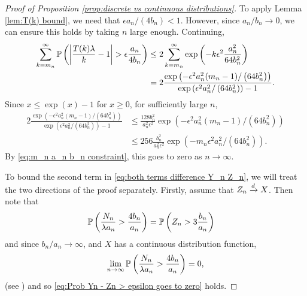 \begin{proof}[Proof of Proposition \ref{prop:discrete vs continuous distributions}]
		To apply Lemma \ref{lem:T(k) bound}, we need that $\epsilon a_n / (4b_n) < 1$. However, since $a_n/b_n \rightarrow 0$, we can ensure this holds by taking $n$ large enough. %
		Continuing,
		\begin{align}
			\sum_{k = m_n}^\infty \mathbb{P}\left(\left|\frac{T(k)\lambda}{k} - 1\right| > \epsilon\frac{a_n}{4 b_n} \right) &\leq 2 \sum_{k = m_n}^\infty \exp\left(-k \epsilon^2 \frac{a_n^2}{64b_n^2}\right)\\
			&= 2 \frac{\exp\left(-\epsilon^2 a_n^2 (m_n-1) /\left(64b_n^2\right)\right)}{\exp\left(\epsilon^2 a_n^2/\left(64b_n^2\right)\right) - 1}.
		\end{align}
		Since $x \leq \exp(x) - 1$ for $x \geq 0$, for sufficiently large $n$,
		\begin{align}
		2 \frac{\exp\left(-\epsilon^2 a_n^2 (m_n-1) /\left(64b_n^2\right)\right)}{\exp\left(\epsilon^2 a_n^2/\left(64b_n^2\right)\right) - 1} &\leq \frac{128 b_n^2}{a_n^2 \epsilon^2} \exp\left(-\epsilon^2 a_n^2 (m_n-1) /\left(64b_n^2\right)\right)\\
		&\leq 256 \frac{b_n^2}{a_n^2 \epsilon^2} \exp\left(-m_n \epsilon^2 a_n^2/\left(64b_n^2\right)\right).
		\end{align}
		By \eqref{eq:m_n a_n b_n constraint}, this goes to zero as $n \rightarrow \infty$.

		To bound the second term in \eqref{eq:both terms difference Y_n Z_n}, we will treat the two directions of the proof separately. Firstly, assume that $Z_n \xrightarrow{d} X$. Then note that
		\begin{align}
			\mathbb{P}\left(\frac{N_n}{\lambda a_n} > \frac{4 b_n}{a_n} \right) &= \mathbb{P}\left(Z_n > 3\frac{b_n}{a_n} \right)
		\end{align}
		and since $b_n / a_n \rightarrow \infty$, and $X$ has a continuous distribution function,
		\begin{equation}
			\lim_{n\rightarrow \infty} \mathbb{P}\left(\frac{N_n}{\lambda a_n} > \frac{4 b_n}{a_n} \right) = 0,
		\end{equation}
		(see \cite[Theorem 14.2, Lemma 2]{Billingsley1995-en}) and so \eqref{eq:Prob Yn - Zn > epsilon goes to zero} holds.


\end{proof}
